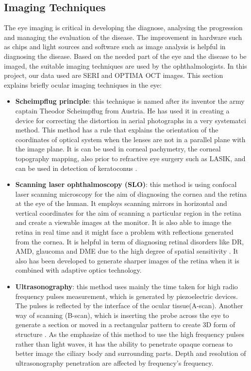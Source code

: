   
\subsection{Imaging Techniques}
The eye imaging is critical in developing the diagnose, analysing the progression and managing the evaluation of the disease.
The improvement in hardware such as chips and light sources and software such as image analysis is helpful in diagnosing the disease.
Based on the needed part of the eye and the disease to be imaged, the suitable imaging techniques are used by the ophthalmologists.
In this project, our data used are SERI and OPTIMA OCT images.
This section explains briefly ocular imaging techniques in the eye:

\begin{itemize}
\item \textbf{Scheimpflug principle}: this technique is named after its inventor the army captain Theodor Scheimpflug from Austria.
He has used it in creating a device for correcting the distortion in aerial photographs in a very systematci method.
This method has a rule that explains the orientation of the coordinates of optical system when the lenses are not in a parallel plane with the image plane.
It is can be used in corneal pachymetry, the corneal topography mapping, also prior to refractive eye surgery such as LASIK, and can be used in detection of keratoconus \cite{hockwin1987measuring}.

\item \textbf{Scanning laser ophthalmoscopy (SLO)}: this method is using confocal laser scanning microscopy for the aim of diagnosing the cornea and the retina at the eye of the human.
It employs scanning mirrors in horizontal and vertical coordinates for the aim of scanning a particular region in the retina and create a viewable images at the monitor.
It is also able to image the retina in real time and it might face a problem with reflections generated from the cornea.
It is helpful in term of diagnosing retinal disorders like DR, AMD, glaucoma and DME due to the high degree of spatial sensitivity \cite{gray2008vivo}.
It also has been developed to generate sharper images of the retina when it is combined with adaptive optics technology.
 
\item \textbf{Ultrasonography}: this method uses mainly the time taken for high radio frequency pulses measurement, which is generated by piezoelectric devices.
The pulses is reflected by the interface of the ocular tissue(A-scan).
Another way of scanning (B-scan), which is inserting the probe across the eye to generate a section or moved in a rectangular pattern to create 3D form of structure \cite{cusumano1998three}.
As the emphasize of this method to use the high frequency pulses rather than light waves, it has the ability to penetrate opaque corneas to better image the ciliary body and surrounding parts.
Depth and resolution of ultrasonography penetration are affected by frequency's frequency.



\end{itemize}
